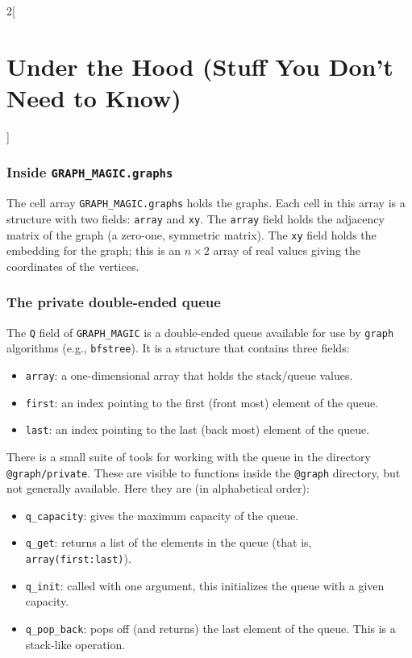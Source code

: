 \documentclass{amsart}
\begin{document}
\begin{multicols}{2}[\section{Under the Hood (Stuff You Don't Need to Know)}]
\subsubsection{Inside \texttt{GRAPH\_MAGIC.graphs}}
\label{inside-GM.g}

The cell array \verb|GRAPH_MAGIC.graphs|  holds the graphs. Each cell in
this array is a structure with two fields: \verb|array| and
\verb|xy|. The \verb|array| field holds the adjacency matrix of the
graph (a zero-one, symmetric matrix). The \verb|xy| field holds the
embedding for the graph; this is an $n\times 2$ array of real values
giving the coordinates of the vertices.


\subsubsection{The private double-ended queue}
\label{Q}

The \verb|Q| field of \verb|GRAPH_MAGIC| is a double-ended queue
available for use by \verb|graph| algorithms (e.g.,
\verb|bfstree|). It is a structure that contains three fields:
\begin{itemize}
\item \verb|array|: a one-dimensional array that holds the stack/queue
  values.
\item \verb|first|: an index pointing to the first (front most) element
  of the queue.
\item \verb|last|: an index pointing to the last (back most) element of
  the queue.
\end{itemize}

There is a small suite of tools for working with the queue in the
directory \verb|@graph/private|. These are visible to functions inside
the \verb|@graph| directory, but not generally available. Here they
are (in alphabetical order):

\begin{itemize}
\item \verb|q_capacity|: gives the maximum capacity of the queue.

\item \verb|q_get|: returns a list of the elements in the queue (that
  is, \verb|array(first:last)|).

\item \verb|q_init|: called with one argument, this initializes the queue
  with a given capacity.

\item \verb|q_pop_back|: pops off (and returns) the last element of
  the queue. This is a stack-like operation.


\end{itemize}
\end{multicols}
\end{document}
